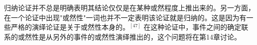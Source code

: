 归纳论证并不总是明确表明其结论仅仅是在某种或然程度上推出来的。另一方面，在一个论证中出现"或然性"一词也并不一定表明该论证就是归纳的。这是因为有一些严格的演绎论证是关于或然性本身的。$^{[47]}$ 在这种论证中，事件之间的确定联系的或然性是从另外的事件的或然性演绎推出的，这个问题将在第14章讨论。

\begin{center}
\end{center}